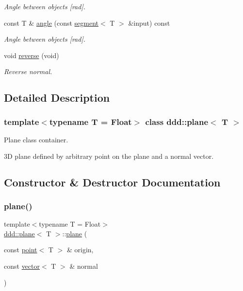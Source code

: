 \begin{DoxyCompactItemize}
\begin{DoxyCompactList}\small\item\em Angle between objects \mbox{[}rad\mbox{]}. \end{DoxyCompactList}\item 
const T \& \hyperlink{classddd_1_1plane_a6a9a1c5fb177702ee67e330d803762ab}{angle} (const \hyperlink{classddd_1_1segment}{segment}$<$ T $>$ \&input) const
\begin{DoxyCompactList}\small\item\em Angle between objects \mbox{[}rad\mbox{]}. \end{DoxyCompactList}\item 
\mbox{\label{classddd_1_1plane_a7a09a14f3a71897ad20b0d377b0f643d}} 
void \hyperlink{classddd_1_1plane_a7a09a14f3a71897ad20b0d377b0f643d}{reverse} (void)
\begin{DoxyCompactList}\small\item\em Reverse normal. \end{DoxyCompactList}\end{DoxyCompactItemize}


\subsection{Detailed Description}
\subsubsection*{template$<$typename T = Float$>$\newline
class ddd\+::plane$<$ T $>$}

Plane class container. 

3D plane defined by arbitrary point on the plane and a normal vector. 

\subsection{Constructor \& Destructor Documentation}
\mbox{\label{classddd_1_1plane_a8b461d0d53aaf84c68875c376e804de3}} 
\subsubsection{\texorpdfstring{plane()}{plane()}\hspace{0.1cm}{\footnotesize\ttfamily [1/2]}}
{\footnotesize\ttfamily template$<$typename T = Float$>$ \\
\hyperlink{classddd_1_1plane}{ddd\+::plane}$<$ T $>$\+::\hyperlink{classddd_1_1plane}{plane} (\begin{DoxyParamCaption}\item[{const \hyperlink{classddd_1_1point}{point}$<$ T $>$ \&}]{origin,  }\item[{const \hyperlink{classddd_1_1vector}{vector}$<$ T $>$ \&}]{normal }\end{DoxyParamCaption})\hspace{0.3cm}{\ttfamily [inline]}}



